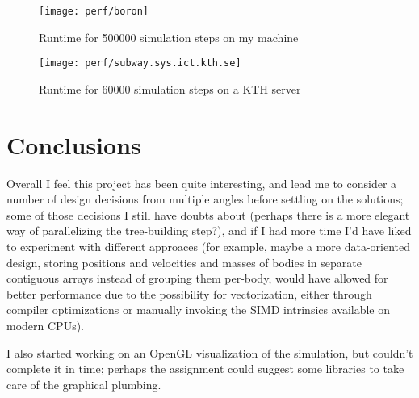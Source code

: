 \documentclass[a4paper, 11pt]{article}
\begin{document}
\begin{figure}[hp]
	\centering
	\texttt{[image: perf/boron]}
	\caption{Runtime for \num{500000} simulation steps on my machine\label{fig:homeperf}}
\end{figure}

\begin{figure}[hp]
	\centering
	\texttt{[image: perf/subway.sys.ict.kth.se]}
	\caption{Runtime for \num{60000} simulation steps on a KTH server\label{fig:servperf}}
\end{figure}

\section{Conclusions}

Overall I feel this project has been quite interesting,
and lead me to consider a number of design decisions from multiple angles
before settling on the solutions;
some of those decisions I still have doubts about
(perhaps there is a more elegant way of parallelizing the tree-building step?),
and if I had more time I'd have liked to experiment with different approaces
(for example, maybe a more data-oriented design,
storing positions and velocities and masses of bodies in separate contiguous arrays
instead of grouping them per-body, would have allowed for better performance due to
the possibility for vectorization, either through compiler optimizations or manually
invoking the SIMD intrinsics available on modern CPUs).

I also started working on an OpenGL visualization of the simulation,
but couldn't complete it in time; perhaps the assignment could suggest some
libraries to take care of the graphical plumbing.
\end{document}
